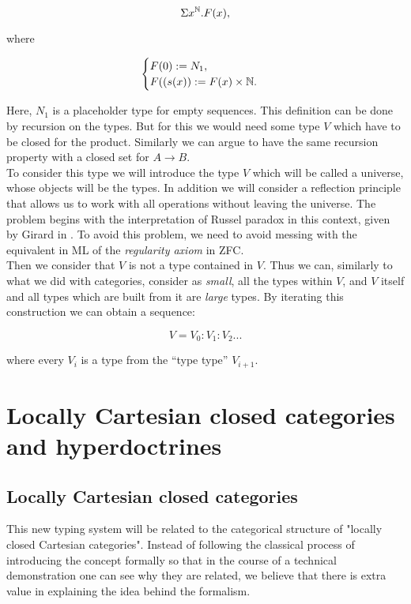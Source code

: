 $$\Sigma x^{\mathbb{N}}. F(x),$$

where

\[   
  \begin{cases}
    F(0):= N_1,\\
    F((s(x)):= F(x)\times \mathbb{N}.
  \end{cases}
\]

Here, $N_1$ is a placeholder type for empty sequences. This definition can be done by recursion on the types. But for this we would need some type $V$ which have to be  closed for the product. Similarly we can argue to have the same recursion property with a closed set for $A \to B$.\\ 

To consider this type we will introduce the type $V$ which will be called a universe, whose objects will be the types. In addition we will consider a reflection principle that allows us to work with all operations without leaving the universe.  The problem begins with the interpretation of Russel paradox in this context, given by Girard in \cite{girard1972interpretation}. To avoid this problem, we need to avoid messing with the equivalent in ML of the \emph{regularity axiom} in ZFC.\\


Then we consider that $V$ is not a type contained in $V$. Thus we can, similarly to what we did with categories, consider as \emph{small}, all the types within $V$, and $V$ itself and all types which are built from it are \emph{large} types. By iterating this construction we can obtain a sequence:

$$V = V_0 : V_1 : V_2 ...$$

where every $V_i$ is a type from the ``type type'' $V_{i+1}$. 


\section{Locally Cartesian closed categories and hyperdoctrines}
\subsection{Locally Cartesian closed categories}
This new typing system will be related to the categorical structure of "locally closed Cartesian categories". Instead of following the classical process of introducing the concept formally so that in the course of a technical demonstration one can see why they are related, we believe that there is extra value in explaining the idea behind the formalism.\\


